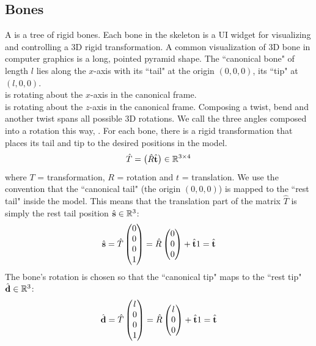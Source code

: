 \documentclass[11pt]{article}
\numberwithin{equation}{section}
\begin{document}
\subsection{Bones}
A  is a tree of rigid bones. Each bone in the skeleton is a UI widget for visualizing and controlling a 3D rigid transformation. A common visualization of 3D bone in computer graphics is a long, pointed pyramid shape.
The ``canonical bone" of length $l$ lies along the $x$-axis with its ``tail" at the origin $(0, 0, 0)$, its ``tip" at $(l, 0, 0)$.\\
 is rotating about the $x$-axis in the canonical frame.\\
 is rotating about the $z$-axis in the canonical frame.
\remark
Composing a twist, bend and another twist spans all possible 3D rotations.
We call the three angles composed into a rotation this way, .
For each bone, there is a rigid transformation that places its tail and tip to the desired positions in the model.
\begin{equation}
	\hat{T} = \begin{pmatrix}\hat{R}\hat{\textbf{t}}\end{pmatrix} \in \mathbb{R}^{3\times 4}
\end{equation}
where $T$ = transformation, $R$ = rotation and $t$ = translation.
We use the convention that the ``canonical tail" (the origin $(0,0,0)$) is mapped to the ``rest tail" inside the model. This means that the translation part of the matrix $\hat{T}$ is simply the rest tail position $\hat{\textbf{s}} \in \mathbb{R}^3$:
\begin{equation}
	\hat{\textbf{s}} = \hat{T}\begin{pmatrix}
		0 \\ 0\\ 0 \\ 1
	\end{pmatrix} = \hat{R} \begin{pmatrix}
		0 \\ 0 \\ 0 
	\end{pmatrix} + \hat{\textbf{t}}1 = \hat{\textbf{t}}
\end{equation}
The bone's rotation is chosen so that the ``canonical tip" maps to the ``rest tip" $\hat{\textbf{d}} \in \mathbb{R}^3$:
\begin{equation}
	\hat{\textbf{d}} = \hat{T}\begin{pmatrix}
		l \\ 0\\ 0 \\ 1
	\end{pmatrix} = \hat{R} \begin{pmatrix}
		l \\ 0 \\ 0 
	\end{pmatrix} + \hat{\textbf{t}}1 = \hat{\textbf{t}}
\end{equation}
\end{document}
